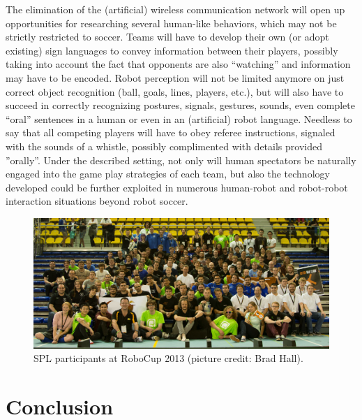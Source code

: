 \documentclass{llncs}
\begin{document}
The elimination of the (artificial) wireless communication network will open up opportunities 
for researching several human-like behaviors, which may not be strictly restricted to soccer. 
Teams will have to develop their own (or adopt existing) sign languages to convey information 
between their players, possibly taking into account the fact that opponents are also 
``watching'' and information may have to be encoded. Robot perception will not be limited 
anymore on just correct object recognition (ball, goals, lines, players, etc.), but will also 
have to succeed in correctly recognizing postures, signals, gestures, sounds, even complete 
``oral'' sentences in a human or even in an (artificial) robot language. Needless to say that 
all competing players will have to obey referee instructions, signaled with the sounds of a 
whistle, possibly complimented with details provided ''orally''. Under the described setting, 
not only will human spectators be naturally engaged into the game play strategies of each 
team, but also the technology developed could be further exploited in numerous human-robot 
and robot-robot interaction situations beyond robot soccer. 



\begin{figure}[t]
\centerline{
\includegraphics[width=\columnwidth]{"spl2013people"}
}
  \caption{SPL participants at RoboCup 2013 (picture credit: Brad Hall).}
  \label{spl2013people}
\end{figure} 

\section{Conclusion}
\end{document}
